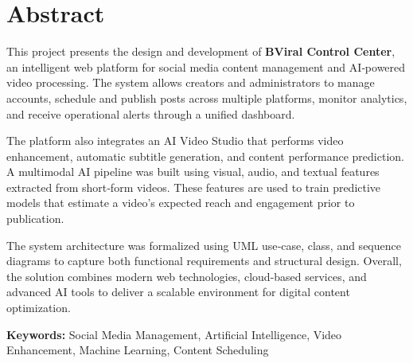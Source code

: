 \chapter*{Abstract}
{}
This project presents the design and development of \textbf{BViral Control Center}, an intelligent web platform for social media content management and AI‑powered video processing. The system allows creators and administrators to manage accounts, schedule and publish posts across multiple platforms, monitor analytics, and receive operational alerts through a unified dashboard.

The platform also integrates an AI Video Studio that performs video enhancement, automatic subtitle generation, and content performance prediction. A multimodal AI pipeline was built using visual, audio, and textual features extracted from short‑form videos. These features are used to train predictive models that estimate a video’s expected reach and engagement prior to publication.

The system architecture was formalized using UML use‑case, class, and sequence diagrams to capture both functional requirements and structural design. Overall, the solution combines modern web technologies, cloud‑based services, and advanced AI tools to deliver a scalable environment for digital content optimization.

\textbf{Keywords:} Social Media Management, Artificial Intelligence, Video Enhancement, Machine Learning, Content Scheduling